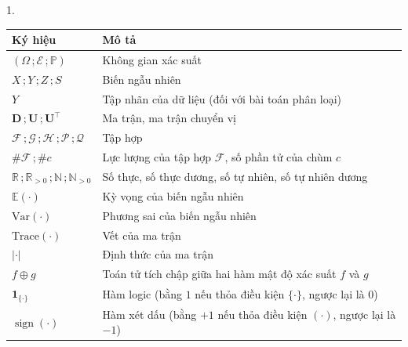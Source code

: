 \documentclass[a4paper,oneside]{book} %
\theoremstyle{plain}
\theoremstyle{plain}
\theoremstyle{nonumberplain}
\begin{document}
{\begin{spacing}{1.}
\begin{table}[h]
	\centering
	\footnotesize
	\begin{tabular*}{\columnwidth}{@{\extracolsep\fill}ll@{\extracolsep\fill}}
		\toprule
		\bf Ký hiệu                                                  & \bf Mô tả                                                   \\ \midrule
		$(\Omega\,;\mathcal{E}\,;\mathbb{P})$  & Không gian xác suất\\
		$X\,;Y\,;Z\,;S$                                               & Biến ngẫu nhiên                                             \\
		$Y$                                                           & Tập nhãn của dữ liệu (đối với bài toán phân loại)           \\
		$ \bm D\,; \bm U\,; \bm U^\intercal $                         & Ma trận, ma trận chuyển vị                                  \\
		$ \mathcal{F}\,;\mathcal{G}\,; \mathcal{H}\,; \mathcal{P}\,;\mathcal{Q} $   & Tập hợp                                                     \\
		$\#\mathcal{F}\,;\#c$                                               & Lực lượng của tập hợp $\mathcal{F}$, số phần tử của chùm $c$                         \\
		$\mathbb{R}\,;\mathbb{R}_{>0}\,;\mathbb{N}\,;\mathbb{N}_{>0}$ & Số thực, số thực dương, số tự nhiên, số tự nhiên dương      \\
		$\mathbb{E}(\cdot)$                                           & Kỳ vọng của biến ngẫu nhiên                                 \\
		$\mathrm{Var}(\cdot)$                                         & Phương sai của biến ngẫu nhiên                              \\
		$\mathrm{Trace}(\cdot)$                                       & Vết của ma trận                                             \\
		$|\cdot|$                                                     & Định thức của ma trận                                       \\
		$f\oplus g$                                                         & Toán tử tích chập giữa hai hàm mật độ xác suất $f$ và $g$            \\
		$\bm1_{\{\cdot\}}$                                           & Hàm logic (bằng $1$ nếu thỏa điều kiện $\{\cdot\}$, ngược lại là $0$) \\
		$\operatorname{sign}(\cdot) $                                  & Hàm xét dấu  (bằng $+1$ nếu thỏa điều kiện $(\cdot)$, ngược lại là $-1$)                    \\

\end{tabular*}
\end{table}
\end{spacing}}
\end{document}
